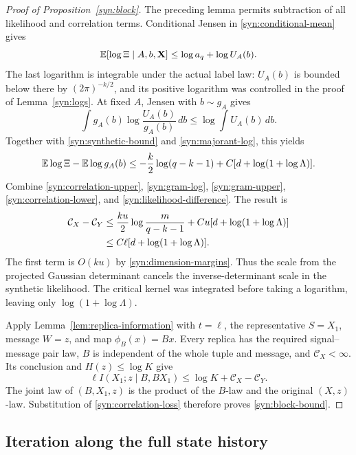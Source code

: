 \begin{proof}[Proof of Proposition~\ref{syn:block}]
The preceding lemma permits subtraction of all likelihood and correlation
terms.  Conditional Jensen in \eqref{syn:conditional-mean} gives
\[
 \mathbb E[\log\Xi\mid A,b,\mathbf X]\le\log a_q+\log U_A(b).
\]
The last logarithm is integrable under the actual label law: \(U_A(b)\)
is bounded below there by \((2\pi)^{-k/2}\), and its positive logarithm
was controlled in the proof of Lemma~\ref{syn:logs}.  At fixed \(A\),
Jensen with \(b\sim g_A\) gives
\[
 \int g_A(b)\log\frac{U_A(b)}{g_A(b)}\,db
 \le\log\int U_A(b)\,db.
\]
Together with \eqref{syn:synthetic-bound} and \eqref{syn:majorant-log},
this yields
\begin{equation}\label{syn:likelihood-difference}
 \mathbb E\log\Xi-\mathbb E\log g_A(b)
 \le-\frac k2\log(q-k-1)
       +C[d+\log(1+\log\Lambda)].
\end{equation}
Combine \eqref{syn:correlation-upper}, \eqref{syn:gram-log},
\eqref{syn:gram-upper}, \eqref{syn:correlation-lower}, and
\eqref{syn:likelihood-difference}.  The result is
\begin{align}
 \mathcal C_X-\mathcal C_Y
 &\le\frac{ku}{2}\log\frac{m}{q-k-1}
       +Cu[d+\log(1+\log\Lambda)] \notag\\
 &\le C\ell[d+\log(1+\log\Lambda)].
 \label{syn:correlation-loss}
\end{align}
The first term is \(O(k u)\) by \eqref{syn:dimension-margins}.
Thus the scale from the projected Gaussian determinant cancels the
inverse-determinant scale in the synthetic likelihood.  The critical
kernel was integrated before taking a logarithm, leaving only
\(\log(1+\log\Lambda)\).

Apply Lemma~\ref{lem:replica-information} with \(t=\ell\),
the representative \(S=X_1\), message \(W=z\), and map
\(\phi_B(x)=Bx\).  Every replica has the required signal--message pair law,
\(B\) is independent of the whole tuple and message, and
\(\mathcal C_X<\infty\).  Its conclusion and \(H(z)\le\log K\) give
\[
 \ell I(X_1;z\mid B,BX_1)
 \le\log K+\mathcal C_X-\mathcal C_Y.
\]
The joint law of \((B,X_1,z)\) is the product of the \(B\)-law and the
original \((X,z)\)-law.  Substitution of \eqref{syn:correlation-loss}
therefore proves \eqref{syn:block-bound}.
\end{proof}

\subsection{Iteration along the full state history}

